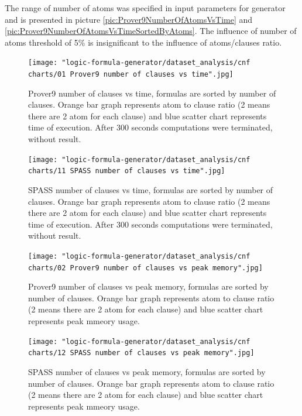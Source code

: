 The range of number of atoms was specified in input parameters for generator and is presented in picture \ref{pic:Prover9NumberOfAtomsVsTime} and \ref{pic:Prover9NumberOfAtomsVsTimeSortedByAtoms}. The influence of number of atoms threshold of 5\% is insignificant to the influence of atoms/clauses ratio.

\begin{figure}[h]
  \centering
  \texttt{[image: "logic-formula-generator/dataset\_analysis/cnf charts/01 Prover9 number of clauses vs time".jpg]}
  \caption{Prover9 number of clauses vs time, formulas are sorted by number of clauses. Orange bar graph represents atom to clause ratio (2 means there are 2 atom for each clause) and blue scatter chart represents time of execution. After 300 seconds computations were terminated, without result.}
  \label{pic:Prover9NumberOfClausesVsTime}
\end{figure}

\begin{figure}[h]
  \centering
  \texttt{[image: "logic-formula-generator/dataset\_analysis/cnf charts/11 SPASS number of clauses vs time".jpg]}
  \caption{SPASS number of clauses vs time, formulas are sorted by number of clauses. Orange bar graph represents atom to clause ratio (2 means there are 2 atom for each clause) and blue scatter chart represents time of execution. After 300 seconds computations were terminated, without result.}
  \label{pic:SPASSNumberOfClausesVsTime}
\end{figure}

\begin{figure}[h]
  \centering
  \texttt{[image: "logic-formula-generator/dataset\_analysis/cnf charts/02 Prover9 number of clauses vs peak memory".jpg]}
  \caption{Prover9 number of clauses vs peak memory, formulas are sorted by number of clauses. Orange bar graph represents atom to clause ratio (2 means there are 2 atom for each clause) and blue scatter chart represents peak mmeory usage.}
  \label{pic:Prover9NumberOfClausesVsMemory}
\end{figure}

\begin{figure}[h]
  \centering
  \texttt{[image: "logic-formula-generator/dataset\_analysis/cnf charts/12 SPASS number of clauses vs peak memory".jpg]}
  \caption{SPASS number of clauses vs peak memory, formulas are sorted by number of clauses. Orange bar graph represents atom to clause ratio (2 means there are 2 atom for each clause) and blue scatter chart represents peak mmeory usage.}
  \label{pic:SPASSNumberOfClausesVsMemory}
\end{figure}

